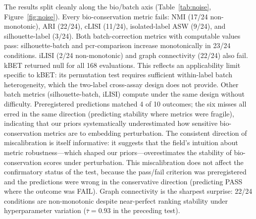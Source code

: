 \documentclass[10pt,letterpaper]{article}
\begin{document}
The results split cleanly along the bio/batch axis (Table~\ref{tab:noise}, Figure~\ref{fig:noise}). Every bio-conservation metric fails: NMI (17/24 non-monotonic), ARI (22/24), cLISI (11/24), isolated-label ASW (9/24), and silhouette-label (3/24). Both batch-correction metrics with computable values pass: silhouette-batch and pcr-comparison increase monotonically in 23/24 conditions. iLISI (2/24 non-monotonic) and graph connectivity (22/24) also fail. kBET returned null for all 168 evaluations. This reflects an applicability limit specific to kBET: its permutation test requires sufficient within-label batch heterogeneity, which the two-label cross-assay design does not provide. Other batch metrics (silhouette-batch, iLISI) compute under the same design without difficulty. Preregistered predictions matched 4 of 10 outcomes; the six misses all erred in the same direction (predicting stability where metrics were fragile), indicating that our priors systematically underestimated how sensitive bio-conservation metrics are to embedding perturbation. The consistent direction of miscalibration is itself informative: it suggests that the field's intuition about metric robustness---which shaped our priors---overestimates the stability of bio-conservation scores under perturbation. This miscalibration does not affect the confirmatory status of the test, because the pass/fail criterion was preregistered and the predictions were wrong in the conservative direction (predicting PASS where the outcome was FAIL). Graph connectivity is the sharpest surprise: 22/24 conditions are non-monotonic despite near-perfect ranking stability under hyperparameter variation ($\bar{\tau} = 0.93$ in the preceding test).
\end{document}

